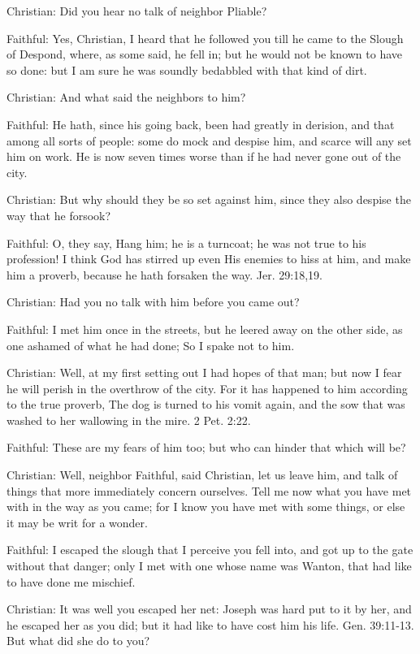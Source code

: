Christian: Did you hear no talk of neighbor Pliable?

Faithful: Yes, Christian, I heard that he followed you till he came to the Slough of Despond, where, as some said, he fell in; but he would not be known to have so done: but I am sure he was soundly bedabbled with that kind of dirt.

Christian: And what said the neighbors to him?

Faithful: He hath, since his going back, been had greatly in derision, and that among all sorts of people: some do mock and despise him, and scarce will any set him on work. He is now seven times worse than if he had never gone out of the city.

Christian: But why should they be so set against him, since they also despise the way that he forsook?

Faithful: O, they say, Hang him; he is a turncoat; he was not true to his profession! I think God has stirred up even His enemies to hiss at him, and make him a proverb, because he hath forsaken the way. Jer. 29:18,19.

Christian: Had you no talk with him before you came out?

Faithful: I met him once in the streets, but he leered away on the other side, as one ashamed of what he had done; So I spake not to him.

Christian: Well, at my first setting out I had hopes of that man; but now I fear he will perish in the overthrow of the city. For it has happened to him according to the true proverb, The dog is turned to his vomit again, and the sow that was washed to her wallowing in the mire. 2 Pet. 2:22.

Faithful: These are my fears of him too; but who can hinder that which will be?

Christian: Well, neighbor Faithful, said Christian, let us leave him, and talk of things that more immediately concern ourselves. Tell me now what you have met with in the way as you came; for I know you have met with some things, or else it may be writ for a wonder.

Faithful: I escaped the slough that I perceive you fell into, and got up to the gate without that danger; only I met with one whose name was Wanton, that had like to have done me mischief.

Christian: It was well you escaped her net: Joseph was hard put to it by her, and he escaped her as you did; but it had like to have cost him his life. Gen. 39:11-13. But what did she do to you?

